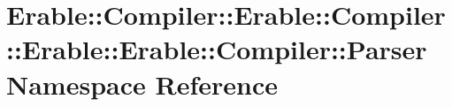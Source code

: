 \hypertarget{namespace_erable_1_1_compiler_1_1_erable_1_1_compiler_1_1_erable_1_1_erable_1_1_compiler_1_1_parser}{}\section{Erable\+::Compiler\+::Erable\+::Compiler\+::Erable\+::Erable\+::Compiler\+::Parser Namespace Reference}
\label{namespace_erable_1_1_compiler_1_1_erable_1_1_compiler_1_1_erable_1_1_erable_1_1_compiler_1_1_parser}
